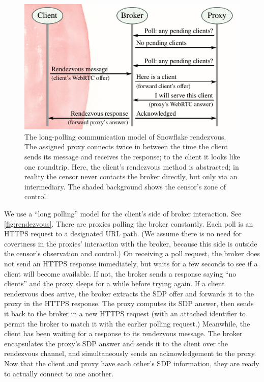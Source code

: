 \documentclass[letterpaper,twocolumn]{article}
\begin{document}
\begin{figure}
\includegraphics{figures/rendezvous/rendezvous}
\caption{
The long-polling communication model of Snowflake rendezvous.
The assigned proxy connects twice in between the time
the client sends its message and receives the response;
to the client it looks like one roundtrip.
Here, the client's rendezvous method is abstracted;
in reality the censor never contacts the broker directly,
but only via an intermediary.
The shaded background shows the censor's zone of control.
}
\label{fig:rendezvous}
\end{figure}

We use a ``long polling'' model for the client's side of broker interaction.
See \autoref{fig:rendezvous}.
There are proxies polling the broker constantly.
Each poll is an HTTPS request to a designated URL path.
(We assume there is no need for covertness
in the proxies' interaction with the broker,
because this side is outside the censor's observation and control.)
On receiving a poll request,
the broker does not send an HTTPS response immediately,
but waits for a few seconds to see if a client will become available.
If not, the broker sends a response saying ``no clients''
and the proxy sleeps for a while before trying again.
If a client rendezvous does arrive,
the broker extracts the SDP offer and forwards it to the proxy
in the HTTPS response.
The proxy computes its SDP answer,
then sends it back to the broker in a new HTTPS request
(with an attached identifier to permit the broker to match it
with the earlier polling request.)
Meanwhile, the client has been waiting for a response
to its rendezvous message.
The broker encapsulates the proxy's SDP answer
and sends it to the client over the rendezvous channel,
and simultaneously sends an acknowledgement to the proxy.
Now that the client and proxy have each other's
SDP information, they are ready to actually connect to one another.
\end{document}
